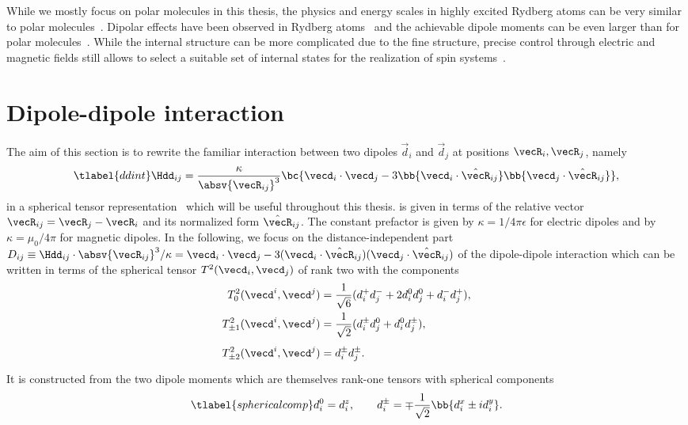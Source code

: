While we mostly focus on polar molecules in this thesis, the physics and energy scales in highly
excited Rydberg atoms can be very similar to polar molecules~\cite{Low2012}. Dipolar effects have
been observed in Rydberg atoms~\cite{Westermann2006,Nipper2012b,Barredo2014,Ravets2015} and the
achievable dipole moments can be even larger than for polar molecules~\cite{Booth2014}. While
the internal structure can be more complicated due to the fine structure, precise control through
electric and magnetic fields still allows to select a suitable set of internal states for the
realization of spin systems~\cite{Barredo2014,Weber2015}.

\section{Dipole-dipole interaction}
The aim of this section is to rewrite the familiar interaction between two dipoles $\vec{d}_i$ and $\vec{d}_j$ at positions $\vecR_i, \vecR_j$, namely
\begin{align} \tlabel{ddint}
\Hdd_{ij} = \frac{\kappa}{\absv{\vecR_{ij}}^3} \bc{ \vecd_i \cdot \vecd_j -3 \bb{ \vecd_i \cdot \hat{\vecR}_{ij} }\bb{ \vecd_j \cdot \hat{\vecR}_{ij} } },
\end{align}
in a spherical tensor representation~\cite{Micheli2007,Gorshkov2011c} which will be useful throughout this thesis.
 is given in terms of the relative vector $\vecR_{ij} = \vecR_j - \vecR_i$ and its normalized form $\hat{\vecR}_{ij}$.
The constant prefactor is given by $\kappa = 1/4\pi\epsilon$ for electric dipoles and by
$\kappa = \mu_0 / 4\pi$ for magnetic dipoles.
In the following, we focus on the distance-independent part $D_{ij} \equiv \Hdd_{ij} \cdot \absv{\vecR_{ij}}^3/\kappa=\vecd_i \cdot \vecd_j -3 (\vecd_i \cdot \hat{\vecR}_{ij})(\vecd_j \cdot \hat{\vecR}_{ij})$ of the dipole-dipole interaction which can be written in terms of the spherical tensor $T^2(\vecd_i, \vecd_j)$ of rank two with the components
\begin{align}
T^2_0(\vecd^i, \vecd^j) &= \frac{1}{\sqrt{6}} (d_i^+ d_j^- + 2d_i^0 d_j^0 + d_i^{-} d_j^{+}), \\
T^2_{\pm 1}(\vecd^i, \vecd^j) &= \frac{1}{\sqrt{2}} (d_i^{\pm} d_j^0 + d_i^0 d_j^{\pm}), \\
T^2_{\pm 2}(\vecd^i, \vecd^j) &= d_i^{\pm} d_j^{\pm} \vphantom{\frac{1}{42}}.
\end{align}
It is constructed from the two dipole moments which are themselves rank-one tensors with spherical components
\begin{align} \tlabel{sphericalcomp}
d^0_i = d^z_i, \qquad d_i^\pm = \mp\frac{1}{\sqrt{2}}\bb{d_i^x\pm i d_i^y}.
\end{align}
